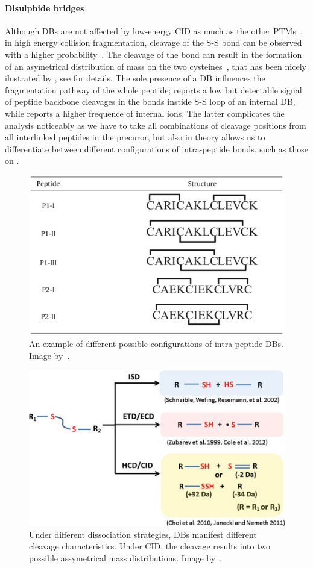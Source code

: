 \paragraph{Disulphide bridges} Although DBs are not affected by low-energy CID as much as the other PTMs~\cite{paizs2005fragmentation, lioe2007novel}, in high energy collision fragmentation, cleavage of the S-S bond can be observed with a higher probability~\cite{bean1992characterization}. The cleavage of the bond can result in the formation of an asymetrical distribution of mass on the two cysteines~\cite{zhang2006mapping}, that has been nicely ilustrated by \citet{tsai2013mass}, see  for details. The sole presence of a DB influences the fragmentation pathway of the whole peptide; \citet{mormann2008fragmentation} reports a low but detectable signal of peptide backbone cleavages in the bonds instide S-S loop of an internal DB, while \citet{clark2011collision} reports a higher frequence of internal ions. The latter complicates the analysis noticeably as we have to take all combinations of cleavage positions from all interlinked peptides in the precuror, but also in theory allows us to differentiate between different configurations of intra-peptide bonds, such as those on .

\begin{figure}
  \centering
  \includegraphics[width=.5\linewidth]{img/intrapeptide-bond.jpeg}
  \caption{An example of different possible configurations of intra-peptide DBs. Image by~\citet{durand2013tandem}.}\label{fig:intrapeptide-bonds}
\end{figure}

\begin{figure}
  \centering
  \includegraphics[width=.6\linewidth]{img/disulfide-bond-cleavage-assymetry.jpg}
  \caption{Under different dissociation strategies, DBs manifest different cleavage characteristics. Under CID, the cleavage results into two possible assymetrical mass distributions. Image by~\citet{tsai2013mass}.}\label{fig:disulfide-bond-cleavage-assymetry}
\end{figure}

